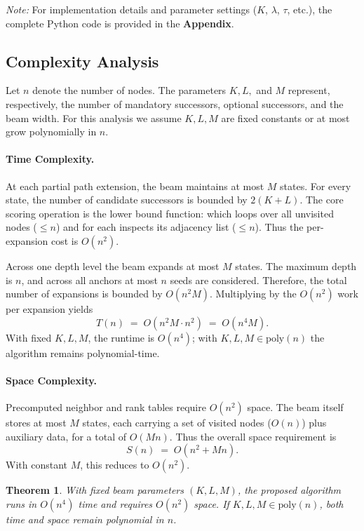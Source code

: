 \documentclass[sn-mathphys]{article}
\theoremstyle{thmstyleone}%
\newtheorem{theorem}{Theorem}%
\theoremstyle{thmstyletwo}%
\theoremstyle{thmstylethree}%
\begin{document}
\noindent \textit{Note:} For implementation details and parameter settings 
($K$, $\lambda$, $\tau$, etc.), the complete Python code is provided in the \textbf{Appendix}.

\subsection{Complexity Analysis}
Let $n$ denote the number of nodes. The parameters $K, L,$ and $M$ represent,
respectively, the number of mandatory successors, optional successors, and the beam
width. For this analysis we assume $K, L, M$ are fixed constants or at most grow
polynomially in $n$.  

\paragraph{Time Complexity.}
At each partial path extension, the beam maintains at most $M$ states. For every state, the
number of candidate successors is bounded by $2(K+L)$. The core scoring operation
is the lower bound function: which loops over all unvisited nodes ($\leq n$) and for each inspects its adjacency list
($\leq n$). Thus the per-expansion cost is $O(n^2)$.  

Across one depth level the beam expands at most $M$ states. The maximum depth is
$n$, and across all anchors at most $n$ seeds are considered. Therefore, the total number
of expansions is bounded by $O(n^2 M)$. Multiplying by the $O(n^2)$ work per
expansion yields
\[
T(n) \;=\; O(n^2 M \cdot n^2) \;=\; O(n^4 M).
\]
With fixed $K,L,M$, the runtime is $O(n^4)$; with $K,L,M \in \mathrm{poly}(n)$ the
algorithm remains polynomial-time.

\paragraph{Space Complexity.}
Precomputed neighbor and rank tables require $O(n^2)$ space. The beam itself stores
at most $M$ states, each carrying a set of visited nodes ($O(n)$) plus auxiliary data,
for a total of $O(Mn)$. Thus the overall space requirement is
\[
S(n) \;=\; O(n^2 + Mn).
\]
With constant $M$, this reduces to $O(n^2)$.

\begin{theorem}
With fixed beam parameters $(K,L,M)$, the proposed algorithm runs in
$O(n^4)$ time and requires $O(n^2)$ space. If $K,L,M \in \mathrm{poly}(n)$, both time
and space remain polynomial in $n$.
\end{theorem}
\end{document}
